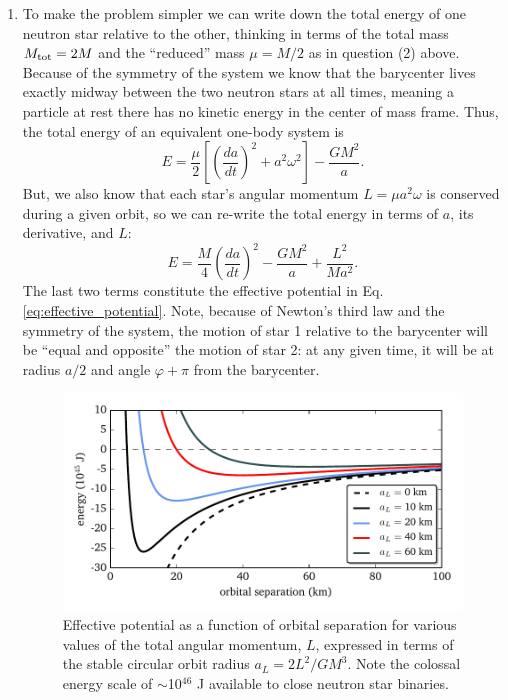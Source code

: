 \documentclass[11pt]{article}
\begin{document}
\begin{enumerate}
\item To make the problem simpler we can write down the total energy of one neutron star relative to the other, thinking in terms of the total mass $M_{\rm tot} = 2M$ and the ``reduced'' mass $\mu = M/2$ as in question (2) above. Because of the symmetry of the system we know that the barycenter lives exactly midway between the two neutron stars at all times, meaning a particle at rest there has no kinetic energy in the center of mass frame. Thus, the total energy of an equivalent one-body system is \[ E = \frac{\mu}{2} \left[ \left(\frac{da}{dt}\right)^2 + a^2\omega^2 \right] - \frac{GM^2}{a}. \] But, we also know that each star's angular momentum $L = \mu a^2\omega$ is conserved during a given orbit, so we can re-write the total energy in terms of $a$, its derivative, and $L$:
\begin{equation}
E = \frac{M}{4}\left(\frac{da}{dt}\right)^2 - \frac{GM^2}{a} + \frac{L^2}{Ma^2}.
\end{equation}
The last two terms constitute the effective potential in Eq. \ref{eq:effective_potential}. Note, because of Newton's third law and the symmetry of the system, the motion of star 1 relative to the barycenter will be ``equal and opposite'' the motion of star 2: at any given time, it will be at radius $a/2$ and angle $\varphi + \pi$ from the barycenter.

\begin{figure}[!b]
\centering
\includegraphics[scale=1]{stable_orbit/kepler_potentials.pdf}
\caption{\label{fig:potentials} Effective potential as a function of orbital separation for various values of the total angular momentum, $L$, expressed in terms of the stable circular orbit radius $a_L = 2L^2/GM^3$. Note the colossal energy scale of $\sim$10$^{46}$ J available to close neutron star binaries.}
\end{figure}


\end{enumerate}
\end{document}
